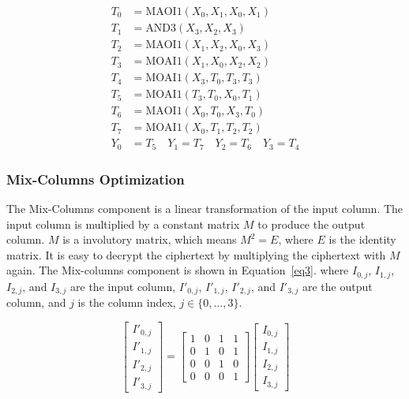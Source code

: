\documentclass[sn-basic]{sn-jnl}%
\begin{document}
\begin{align}
    T_0 & = \text{MAOI1}(X_0, X_1, X_0, X_1) \nonumber          \\
    T_1 & = \text{AND3}(X_3, X_2, X_3) \nonumber                \\
    T_2 & = \text{MAOI1}(X_1, X_2, X_0, X_3) \nonumber          \\
    T_3 & = \text{MOAI1}(X_1, X_0, X_2, X_2) \nonumber          \\
    T_4 & = \text{MOAI1}(X_3, T_0, T_3, T_3) \nonumber          \\
    T_5 & = \text{MOAI1}(T_3, T_0, X_0, T_1) \nonumber          \\
    T_6 & = \text{MAOI1}(X_0, T_0, X_3, T_0) \nonumber          \\
    T_7 & = \text{MOAI1}(X_0, T_1, T_2, T_2) \nonumber          \\
    Y_0 & = T_5 \quad Y_1 = T_7 \quad Y_2 = T_6 \quad Y_3 = T_4
    \label{eq2}
\end{align}

\subsubsection{Mix-Columns Optimization}\label{subsubsec2}

The Mix-Columns component is a linear transformation of the input column.
The input column is multiplied by a constant matrix $M$ to produce the output column.
$M$ is a involutory matrix, which means $M^2 = E$, where $E$ is the identity matrix.
It is easy to decrypt the ciphertext by multiplying the ciphertext with $M$ again.
The Mix-columns component is shown in Equation~\ref{eq3}.
where $I_{0,j}$, $I_{1,j}$, $I_{2,j}$, and $I_{3,j}$ are the input column, $I'_{0,j}$, $I'_{1,j}$, $I'_{2,j}$, and $I'_{3,j}$ are the output column, and $j$ is the column index, $j \in \{0,\dots,3\}$.

\begin{equation}
    \begin{bmatrix}
        I'_{0,j} \\
        I'_{1,j} \\
        I'_{2,j} \\
        I'_{3,j}
    \end{bmatrix}
    =
    \begin{bmatrix}
        1 & 0 & 1 & 1 \\
        0 & 1 & 0 & 1 \\
        0 & 0 & 1 & 0 \\
        0 & 0 & 0 & 1
    \end{bmatrix}
    \begin{bmatrix}
        I_{0,j} \\
        I_{1,j} \\
        I_{2,j} \\
        I_{3,j}
    \end{bmatrix}
    \label{eq3}
\end{equation}
\end{document}
